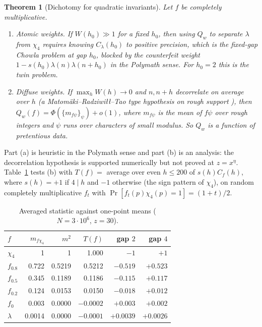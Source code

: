 \documentclass[11pt]{amsart}
\newtheorem{theorem}{Theorem}[section]
\theoremstyle{definition}
\theoremstyle{remark}
\begin{document}
\begin{theorem}[Dichotomy for quadratic invariants]\label{thm:dichotomy}
Let $f$ be completely multiplicative.
\begin{enumerate}
\item[(a)] \emph{Atomic weights.} If $W(h_0)\gg1$ for a fixed $h_0$, then using $Q_w$ to separate $\lambda$ from $\chi_4$ requires knowing $C_\lambda(h_0)$ to positive precision, which is the fixed-gap Chowla problem at gap $h_0$, blocked by the counterfeit weight $1-s(h_0)\lambda(n)\lambda(n+h_0)$ in the Polymath sense. For $h_0=2$ this is the twin problem.
\item[(b)] \emph{Diffuse weights.} If $\max_hW(h)\to0$ and $n,n+h$ decorrelate on average over $h$ (a Matom\"aki--Radziwi\l{}\l{}--Tao type hypothesis on rough support \cite{MRT15}), then $Q_w(f)=\Phi(\{m_{f\psi}\}_\psi)+o(1)$, where $m_{f\psi}$ is the mean of $f\psi$ over rough integers and $\psi$ runs over characters of small modulus. So $Q_w$ is a function of pretentious data.
\end{enumerate}
\end{theorem}

Part (a) is heuristic in the Polymath sense and part (b) is an analysis: the decorrelation hypothesis is supported numerically but not proved at $z=x^\eta$. Table~\ref{tab:avg} tests (b) with $T(f)=$ average over even $h\le200$ of $s(h)C_f(h)$, where $s(h)=+1$ if $4\mid h$ and $-1$ otherwise (the sign pattern of $\chi_4$), on random completely multiplicative $f_t$ with $\Pr[f_t(p)\chi_4(p)=1]=(1+t)/2$.

\begin{table}[h]
\centering\small
\caption{Averaged statistic against one-point means ($N=3\cdot10^6$, $z=30$).}\label{tab:avg}
\begin{tabular}{lrrrrr}
\toprule
$f$ & $m_{f\chi_4}$ & $m^2$ & $T(f)$ & gap $2$ & gap $4$\\
\midrule
$\chi_4$ & 1 & 1 & 1.000 & $-1$ & $+1$\\
$f_{0.8}$ & 0.722 & 0.5219 & 0.5212 & $-0.519$ & $+0.523$\\
$f_{0.5}$ & 0.345 & 0.1189 & 0.1186 & $-0.115$ & $+0.117$\\
$f_{0.2}$ & 0.124 & 0.0153 & 0.0150 & $-0.018$ & $+0.012$\\
$f_0$ & 0.003 & 0.0000 & $-0.0002$ & $+0.003$ & $+0.002$\\
$\lambda$ & 0.0014 & 0.0000 & $-0.0001$ & $+0.0039$ & $+0.0026$\\
\bottomrule
\end{tabular}
\end{table}
\end{document}
